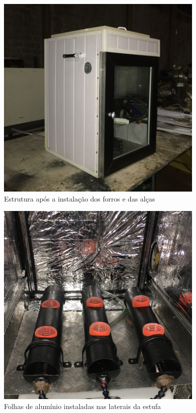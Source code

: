 \begin{figure}[!htb]
	\centering
	\includegraphics[width=10cm]{figuras/isolamento3.png}
	\caption{Estrutura após a instalação dos forros e das alças}
	\label{fig:isolamento3}
\end{figure}
\begin{figure}[!htb]
	\centering
	\includegraphics[width=10cm]{figuras/folha_aluminio.jpg}
	\caption{Folhas de alumínio instaladas nas laterais da estufa}
	\label{fig:folha_aluminio}
\end{figure}

